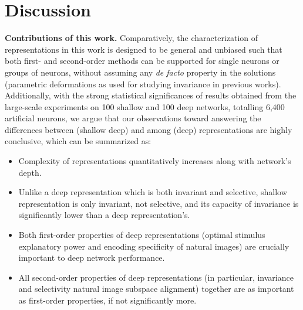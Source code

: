 \documentclass[10pt,twocolumn,letterpaper]{article}
\begin{document}

\section{Discussion}

{\bf Contributions of this work.} Comparatively, the characterization of representations in this work is designed to be general and unbiased such that both first- and second-order methods can be supported for single neurons or groups of neurons, without assuming any \emph{de facto} property in the solutions (\eg parametric deformations as used for studying invariance in previous works).
Additionally, with the strong statistical significances of results obtained from the large-scale experiments on 100 shallow and 100 deep networks, totalling 6,400 artificial neurons, we argue that our observations toward answering the differences between (shallow \vs deep) and among (deep) representations are highly conclusive, which can be summarized as:
\begin{itemize} %
\setlength\itemsep{0.0ex}
\item Complexity of representations quantitatively increases along with network's depth.
\item Unlike a deep representation which is both invariant and selective, shallow representation is only invariant, not selective, and its capacity of invariance is significantly lower than a deep representation's.
\item Both first-order properties of deep representations (optimal stimulus explanatory power and encoding specificity of natural images) are crucially important to deep network performance.
\item All second-order properties of deep representations (in particular, invariance and selectivity \vs natural image subspace alignment) together are as important as first-order properties, if not significantly more.
\end{itemize}
\end{document}
